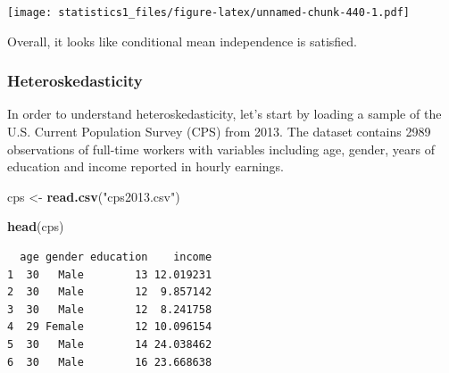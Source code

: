\documentclass[]{article}
\newenvironment{Shaded}{\begin{snugshade}}{\end{snugshade}}
\newcommand{\KeywordTok}[1]{\textcolor[rgb]{0.13,0.29,0.53}{\textbf{#1}}}
\newcommand{\DataTypeTok}[1]{\textcolor[rgb]{0.13,0.29,0.53}{#1}}
\newcommand{\DecValTok}[1]{\textcolor[rgb]{0.00,0.00,0.81}{#1}}
\newcommand{\StringTok}[1]{\textcolor[rgb]{0.31,0.60,0.02}{#1}}
\newcommand{\OperatorTok}[1]{\textcolor[rgb]{0.81,0.36,0.00}{\textbf{#1}}}
\newcommand{\NormalTok}[1]{#1}
\theoremstyle{definition}
\theoremstyle{definition}
\theoremstyle{definition}
\theoremstyle{remark}
\begin{document}
\begin{Shaded}
\end{Shaded}

\texttt{[image: statistics1\_files/figure-latex/unnamed-chunk-440-1.pdf]}

Overall, it looks like conditional mean independence is satisfied.

\subsubsection{Heteroskedasticity}\label{heteroskedasticity}

In order to understand heteroskedasticity, let's start by loading a
sample of the U.S. Current Population Survey (CPS) from 2013. The
dataset contains 2989 observations of full-time workers with variables
including age, gender, years of education and income reported in hourly
earnings.

\begin{Shaded}
\begin{Highlighting}[]
\NormalTok{cps <-}\StringTok{ }\KeywordTok{read.csv}\NormalTok{(}\StringTok{"cps2013.csv"}\NormalTok{)}
\end{Highlighting}
\end{Shaded}

\begin{Shaded}
\begin{Highlighting}[]
\KeywordTok{head}\NormalTok{(cps)}
\end{Highlighting}
\end{Shaded}

\begin{verbatim}
  age gender education    income
1  30   Male        13 12.019231
2  30   Male        12  9.857142
3  30   Male        12  8.241758
4  29 Female        12 10.096154
5  30   Male        14 24.038462
6  30   Male        16 23.668638
\end{verbatim}
\end{document}

